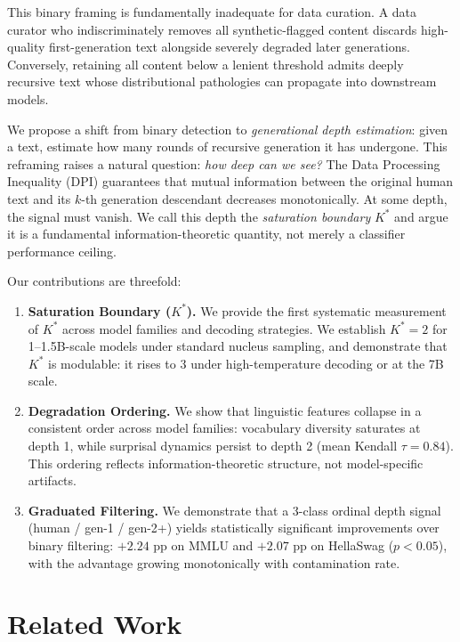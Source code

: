 \documentclass[11pt,a4paper]{article}
\begin{document}
This binary framing is fundamentally inadequate for data curation. A data curator who indiscriminately removes all synthetic-flagged content discards high-quality first-generation text alongside severely degraded later generations. Conversely, retaining all content below a lenient threshold admits deeply recursive text whose distributional pathologies can propagate into downstream models.

We propose a shift from binary detection to \emph{generational depth estimation}: given a text, estimate how many rounds of recursive generation it has undergone. This reframing raises a natural question: \textit{how deep can we see?} The Data Processing Inequality (DPI) guarantees that mutual information between the original human text and its $k$-th generation descendant decreases monotonically. At some depth, the signal must vanish. We call this depth the \emph{saturation boundary} $K^*$ and argue it is a fundamental information-theoretic quantity, not merely a classifier performance ceiling.

Our contributions are threefold:

\begin{enumerate}[leftmargin=*,itemsep=2pt]
    \item \textbf{Saturation Boundary ($K^*$).} We provide the first systematic measurement of $K^*$ across model families and decoding strategies. We establish $K^*{=}2$ for 1--1.5B-scale models under standard nucleus sampling, and demonstrate that $K^*$ is modulable: it rises to 3 under high-temperature decoding or at the 7B scale.

    \item \textbf{Degradation Ordering.} We show that linguistic features collapse in a consistent order across model families: vocabulary diversity saturates at depth 1, while surprisal dynamics persist to depth 2 (mean Kendall $\tau{=}0.84$). This ordering reflects information-theoretic structure, not model-specific artifacts.

    \item \textbf{Graduated Filtering.} We demonstrate that a 3-class ordinal depth signal (human / gen-1 / gen-2+) yields statistically significant improvements over binary filtering: $+2.24$ pp on MMLU and $+2.07$ pp on HellaSwag ($p{<}0.05$), with the advantage growing monotonically with contamination rate.
\end{enumerate}

\section{Related Work}
\label{sec:related}
\end{document}
